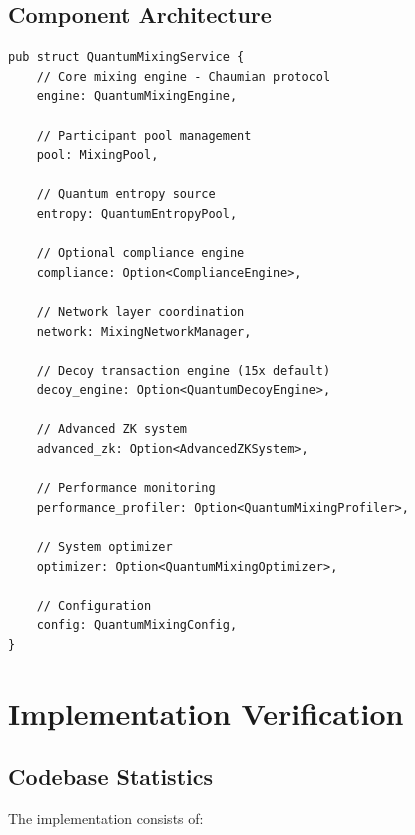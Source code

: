\documentclass[12pt,a4paper]{article}
\begin{document}
\subsection{Component Architecture}

\begin{lstlisting}[style=rustcode, caption=Core Mixing Service Architecture]
pub struct QuantumMixingService {
    // Core mixing engine - Chaumian protocol
    engine: QuantumMixingEngine,

    // Participant pool management
    pool: MixingPool,

    // Quantum entropy source
    entropy: QuantumEntropyPool,

    // Optional compliance engine
    compliance: Option<ComplianceEngine>,

    // Network layer coordination
    network: MixingNetworkManager,

    // Decoy transaction engine (15x default)
    decoy_engine: Option<QuantumDecoyEngine>,

    // Advanced ZK system
    advanced_zk: Option<AdvancedZKSystem>,

    // Performance monitoring
    performance_profiler: Option<QuantumMixingProfiler>,

    // System optimizer
    optimizer: Option<QuantumMixingOptimizer>,

    // Configuration
    config: QuantumMixingConfig,
}
\end{lstlisting}

\section{Implementation Verification}

\subsection{Codebase Statistics}

The implementation consists of:
\end{document}
